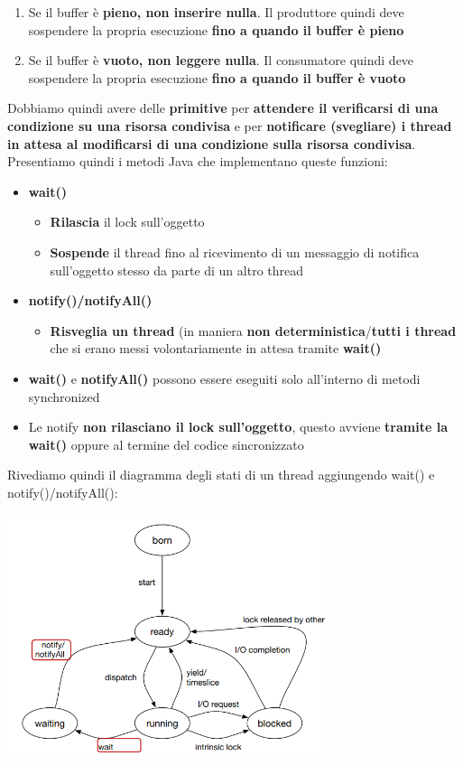 \documentclass[12pt]{article}
\begin{document}
\begin{enumerate}
    \item Se il buffer è \textbf{pieno, non inserire nulla}. Il produttore quindi deve sospendere la propria esecuzione \textbf{fino a quando il buffer è pieno}
    \item Se il buffer è \textbf{vuoto, non leggere nulla}. Il consumatore quindi deve sospendere la propria esecuzione \textbf{fino a quando il buffer è vuoto}
\end{enumerate}
Dobbiamo quindi avere delle \textbf{primitive} per \textbf{attendere il verificarsi di una condizione su una risorsa condivisa} e per \textbf{notificare (svegliare) i thread in attesa al modificarsi di una condizione sulla risorsa condivisa}. Presentiamo quindi i metodi Java che implementano queste funzioni:
\begin{itemize}
    \item \textbf{wait()}
          \begin{itemize}
              \item \textbf{Rilascia} il lock sull'oggetto
              \item \textbf{Sospende} il thread fino al ricevimento di un messaggio di notifica sull'oggetto stesso da parte di un altro thread
          \end{itemize}
    \item \textbf{notify()/notifyAll()}
          \begin{itemize}
              \item \textbf{Risveglia un thread} (in maniera \textbf{non deterministica}/\textbf{tutti i thread}  che si erano messi volontariamente in attesa tramite \textbf{wait()}
          \end{itemize}
    \item \textbf{wait()} e \textbf{notifyAll()} possono essere eseguiti solo all'interno di metodi synchronized
    \item Le notify \textbf{non rilasciano il lock sull'oggetto}, questo avviene \textbf{tramite la wait()} oppure al termine del codice sincronizzato
\end{itemize}
Rivediamo quindi il diagramma degli stati di un thread aggiungendo wait() e notify()/notifyAll():
\begin{center}
    \includegraphics[width = 0.70\textwidth]{Images/87.PNG}
\end{center}
\end{document}
